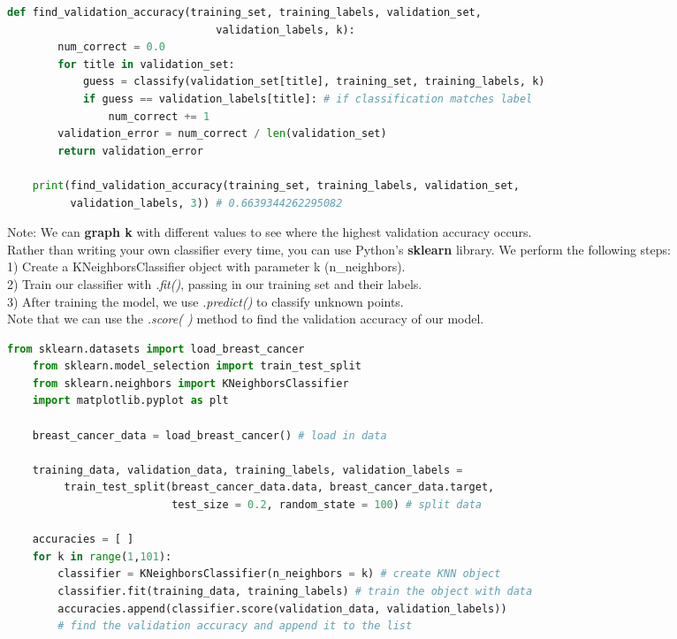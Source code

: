 \documentclass[11pt, a4paper]{article}
\begin{document}
\begin{spacing}{1.1}
\begin{lstlisting}[language=Python]
	def find_validation_accuracy(training_set, training_labels, validation_set, 
	                             validation_labels, k):
		num_correct = 0.0
		for title in validation_set:
			guess = classify(validation_set[title], training_set, training_labels, k)
			if guess == validation_labels[title]: # if classification matches label
				num_correct += 1
		validation_error = num_correct / len(validation_set)
		return validation_error
	
	print(find_validation_accuracy(training_set, training_labels, validation_set, 
	      validation_labels, 3)) # 0.6639344262295082 \end{lstlisting}\vspace*{1mm}
	Note: We can \textbf{graph k} with different values to see where the highest validation accuracy occurs. \vspace*{2mm} \\
	Rather than writing your own classifier every time, you can use Python’s \textbf{sklearn} library. We perform the following steps: \\
	\hspace*{3mm} 1) Create a KNeighborsClassifier object with parameter k (n\_neighbors). \\
	\hspace*{3mm} 2) Train our classifier with \textit{.fit()}, passing in our training set and their labels. \\
	\hspace*{3mm} 3) After training the model, we use \textit{.predict()} to classify unknown points. \vspace*{1mm} \\
	Note that we can use the \textit{.score( )} method to find the validation accuracy of our model.
	\begin{lstlisting}[language=Python]
	from sklearn.datasets import load_breast_cancer
	from sklearn.model_selection import train_test_split 
	from sklearn.neighbors import KNeighborsClassifier
	import matplotlib.pyplot as plt 
	
	breast_cancer_data = load_breast_cancer() # load in data
	
	training_data, validation_data, training_labels, validation_labels = 
	     train_test_split(breast_cancer_data.data, breast_cancer_data.target, 
	                      test_size = 0.2, random_state = 100) # split data
	
	accuracies = [ ]
	for k in range(1,101):
		classifier = KNeighborsClassifier(n_neighbors = k) # create KNN object
		classifier.fit(training_data, training_labels) # train the object with data
		accuracies.append(classifier.score(validation_data, validation_labels))
		# find the validation accuracy and append it to the list
	

\end{lstlisting}
\end{spacing}
\end{document}
